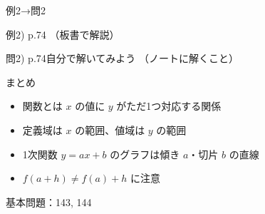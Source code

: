 \documentclass[aspectratio=43,professionalfonts,handout]{beamer}
\begin{document}
\begin{frame}{例2→問2}
  \begin{exampleblock}{例2) p.74}
    （板書で解説）
  \end{exampleblock}

  \vfill

  \begin{block}{問2) p.74\quad 自分で解いてみよう}
    （ノートに解くこと）
  \end{block}
\end{frame}

\begin{frame}{まとめ}
  \begin{itemize}
    \item 関数とは $x$ の値に $y$ がただ1つ対応する関係
    \item 定義域は $x$ の範囲、値域は $y$ の範囲
    \item 1次関数 $y=ax+b$ のグラフは傾き $a$・切片 $b$ の直線
    \item $f(a+h) \neq f(a)+h$ に注意
  \end{itemize}

  \vfill
  {\small 基本問題：143, 144}
\end{frame}
\end{document}
